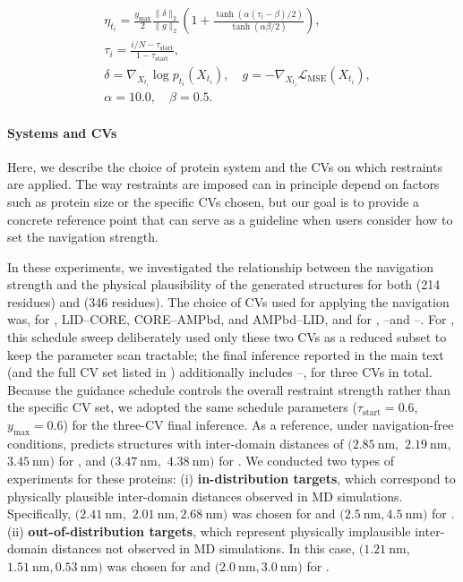 \begin{equation}
    \begin{split}
        &\eta_{t_i} =
        \frac{y_{\text{max}}}{2}
        \frac{\| \delta \|_2}{\| g \|_2}
        \left(
            1 +
            \frac{\tanh\!\left( \alpha(\tau_i - \beta) / 2 \right)}
                 {\tanh\!\left( \alpha\beta / 2 \right)}
        \right),
        \\
        &\tau_i = \frac{i / N - \tau_{\text{start}}}{1 - \tau_{\text{start}}},
        \\[1.5ex]
        &\delta = \nabla_{X_{t_i}}\log p_{t_i}(X_{t_i}),
        \quad
        g = - \nabla_{X_{t_i}} \mathcal{L}_{\text{MSE}}(X_{t_i}),
        \\
        &\alpha = 10.0, \quad \beta = 0.5.
        \label{eq:sigmoid}
    \end{split}
\end{equation}

\paragraph{Systems and CVs}
Here, we describe the choice of protein system and the CVs on which restraints are applied.
The way restraints are imposed can in principle depend on factors such as protein size or the specific CVs chosen,
but our goal is to provide a concrete reference point that can serve as a guideline when users consider how to set the navigation strength.

In these experiments, we investigated the relationship between the navigation strength and the physical plausibility of the generated structures for both \AK (214 residues) and \flhac (346 residues).
The choice of CVs used for applying the navigation was, for \AK, LID–CORE, CORE–AMPbd, and AMPbd–LID, and for \flhac, \acdi–\acdiv and \acdii–\acdiii.
For \flhac, this schedule sweep deliberately used only these two CVs as a reduced subset to keep the parameter scan tractable; the final inference reported in the main text (and the full CV set listed in ) additionally includes \acdii–\acdiv, for three CVs in total.
Because the guidance schedule controls the overall restraint strength rather than the specific CV set, we adopted the same schedule parameters ($\tau_{\text{start}}=0.6$, $y_{\text{max}}=0.6$) for the three-CV final inference.
As a reference, under navigation-free conditions, \AFiii predicts structures with inter-domain distances of $(2.85~\mathrm{nm},$ $2.19~\mathrm{nm},$ $3.45~\mathrm{nm})$ for \AK, and $(3.47~\mathrm{nm},$ $4.38~\mathrm{nm})$ for \flhac.
We conducted two types of experiments for these proteins:
(i) \textbf{in-distribution targets}, which correspond to physically plausible inter-domain distances observed in MD simulations. Specifically, $(2.41~\mathrm{nm},$ $2.01~\mathrm{nm},$$2.68~\mathrm{nm})$ was chosen for \AK and $(2.5~\mathrm{nm},$$4.5~\mathrm{nm})$ for \flhac.
(ii) \textbf{out-of-distribution targets}, which represent physically implausible inter-domain distances not observed in MD simulations. In this case, $(1.21~\mathrm{nm},$$1.51~\mathrm{nm},$$0.53~\mathrm{nm})$ was chosen for \AK and $(2.0~\mathrm{nm},$$3.0~\mathrm{nm})$ for \flhac.

